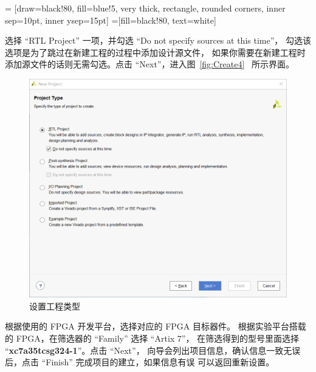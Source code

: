 \documentclass[ichigo,normal,cn]{elegantnote_mod}
\begin{document}
 = [draw=black!80, fill=blue!5, very thick,
    rectangle, rounded corners, inner sep=10pt, inner ysep=15pt]
 =[fill=black!80, text=white]

\begin{center}
\end{center}

选择 “RTL Project” 一项，并勾选 “Do not specify sources at this time”，
勾选该选项是为了跳过在新建工程的过程中添加设计源文件，
如果你需要在新建工程时添加源文件的话则无需勾选。点击 “Next”，进入图~\ref{fig:Create4}~ 所示界面。

\begin{figure}[!htbp]
    \centering
    \includegraphics[width=.8\textwidth]{fig/Create3}
    \caption{设置工程类型}
    \label{fig:Create3}
\end{figure}

根据使用的 FPGA 开发平台，选择对应的 FPGA 目标器件。
根据实验平台搭载的 FPGA，在筛选器的 “Family” 选择 “Artix 7”，
在筛选得到的型号里面选择 “\textbf{\textcolor{ichigo}{xc7a35tcsg324-1}}”。点击 “Next”，
向导会列出项目信息，确认信息一致无误后，点击 “Finish” 完成项目的建立，如果信息有误
可以返回重新设置。 
\end{document}
